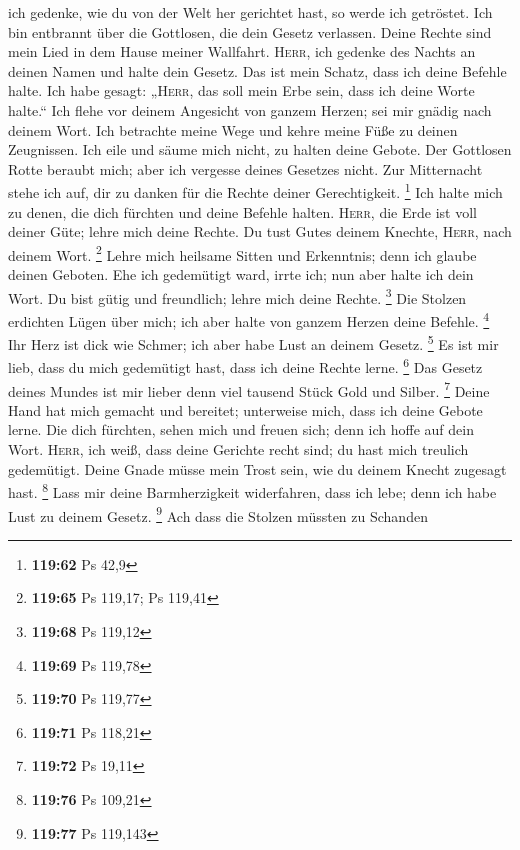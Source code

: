 ich gedenke, wie du von der Welt her gerichtet hast, so werde ich
getröstet.  Ich bin entbrannt über die Gottlosen, die
dein Gesetz verlassen.  Deine Rechte sind mein Lied in
dem Hause meiner Wallfahrt.  \textsc{Herr}, ich gedenke
des Nachts an deinen Namen und halte dein Gesetz.  Das
ist mein Schatz, dass ich deine Befehle halte.  Ich habe
gesagt: „\textsc{Herr}, das soll mein Erbe sein, dass ich deine Worte
halte.``  Ich flehe vor deinem Angesicht von ganzem
Herzen; sei mir gnädig nach deinem Wort.  Ich betrachte
meine Wege und kehre meine Füße zu deinen Zeugnissen. 
Ich eile und säume mich nicht, zu halten deine Gebote. 
Der Gottlosen Rotte beraubt mich; aber ich vergesse deines Gesetzes
nicht.  Zur Mitternacht stehe ich auf, dir zu danken für
die Rechte deiner Gerechtigkeit. \footnote{\textbf{119:62} Ps 42,9}
 Ich halte mich zu denen, die dich fürchten und deine
Befehle halten.  \textsc{Herr}, die Erde ist voll deiner
Güte; lehre mich deine Rechte.  Du tust Gutes deinem
Knechte, \textsc{Herr}, nach deinem Wort. \footnote{\textbf{119:65} Ps
  119,17; Ps 119,41}  Lehre mich heilsame Sitten und
Erkenntnis; denn ich glaube deinen Geboten.  Ehe ich
gedemütigt ward, irrte ich; nun aber halte ich dein Wort.
 Du bist gütig und freundlich; lehre mich deine Rechte.
\footnote{\textbf{119:68} Ps 119,12}  Die Stolzen
erdichten Lügen über mich; ich aber halte von ganzem Herzen deine
Befehle. \footnote{\textbf{119:69} Ps 119,78}  Ihr Herz
ist dick wie Schmer; ich aber habe Lust an deinem Gesetz. \footnote{\textbf{119:70}
  Ps 119,77}  Es ist mir lieb, dass du mich gedemütigt
hast, dass ich deine Rechte lerne. \footnote{\textbf{119:71} Ps 118,21}
 Das Gesetz deines Mundes ist mir lieber denn viel
tausend Stück Gold und Silber. \footnote{\textbf{119:72} Ps 19,11}
 Deine Hand hat mich gemacht und bereitet; unterweise
mich, dass ich deine Gebote lerne.  Die dich fürchten,
sehen mich und freuen sich; denn ich hoffe auf dein Wort.
 \textsc{Herr}, ich weiß, dass deine Gerichte recht sind;
du hast mich treulich gedemütigt.  Deine Gnade müsse mein
Trost sein, wie du deinem Knecht zugesagt hast. \footnote{\textbf{119:76}
  Ps 109,21}  Lass mir deine Barmherzigkeit widerfahren,
dass ich lebe; denn ich habe Lust zu deinem Gesetz. \footnote{\textbf{119:77}
  Ps 119,143}  Ach dass die Stolzen müssten zu Schanden
